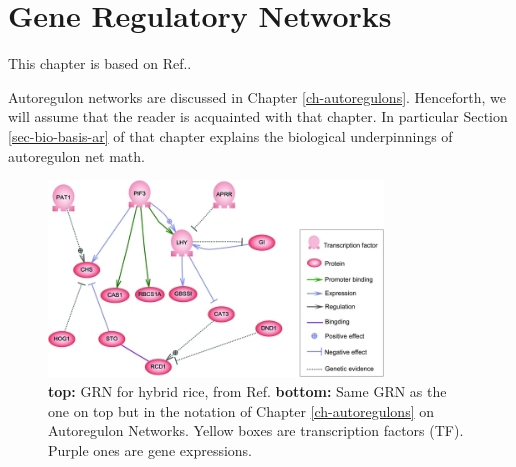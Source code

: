 \chapter{Gene Regulatory Networks}
\label{ch_gene_reg_net}


This chapter is based on Ref.\cite{wiki-gene-reg-net}.

Autoregulon networks are
discussed in Chapter \ref{ch-autoregulons}.
Henceforth, we
 will
assume that 
the reader is acquainted
with that chapter.
In particular Section \ref{sec-bio-basis-ar}
of that chapter
explains the biological
underpinnings of 
autoregulon net math.

\begin{figure}[h!]
\centering
\includegraphics[width=3.5in]
{gene-reg-net/DG_Network_in_Hybrid_Rice.png}
\caption{{\bf top:} GRN for hybrid rice, from Ref.\cite{wiki-gene-reg-net}
{\bf bottom:} Same GRN 
as the one on top but in the notation of Chapter \ref{ch-autoregulons}
on Autoregulon Networks.
Yellow boxes are transcription factors (TF). Purple ones are gene expressions.}
\label{fig-rice-gene-reg-net}
\end{figure}





